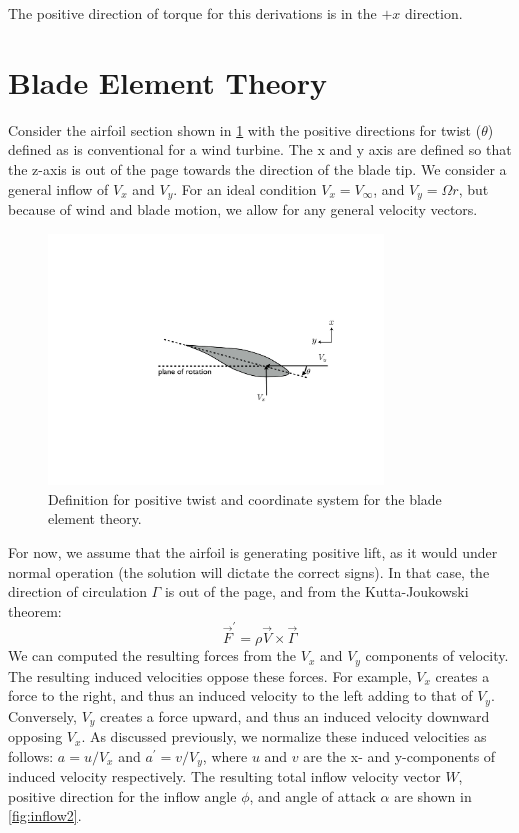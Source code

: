 \documentclass{article}
\begin{document}
The positive direction of torque for this derivations is in the $+x$ direction.

\section{Blade Element Theory}
\label{sec:be}

Consider the airfoil section shown in \cref{fig:inflow1} with the positive directions for twist ($\theta$) defined as is conventional for a wind turbine.  The x and y axis are defined so that the z-axis is out of the page towards the direction of the blade tip.  We consider a general inflow of $V_x$ and $V_y$.  For an ideal condition $V_x = V_\infty$, and $V_y = \Omega r$, but because of wind and blade motion, we allow for any general velocity vectors.

\begin{figure}[htbp]
\centering
\includegraphics[width=3.5in]{figures/inflow1}
\caption{Definition for positive twist and coordinate system for the blade element theory.}
\label{fig:inflow1}
\end{figure}

For now, we assume that the airfoil is generating positive lift, as it would under normal operation (the solution will dictate the correct signs).  In that case, the direction of circulation $\Gamma$ is out of the page, and from the Kutta-Joukowski theorem:
\begin{equation}
    \vec{F}^\prime = \rho \vec{V} \times \vec{\Gamma}
\end{equation}
We can computed the resulting forces from the $V_x$ and $V_y$ components of velocity.  The resulting induced velocities oppose these forces.  For example, $V_x$ creates a force to the right, and thus an induced velocity to the left adding to that of $V_y$.  Conversely, $V_y$ creates a force upward, and thus an induced velocity downward opposing $V_x$.  As discussed previously, we normalize these induced velocities as follows: $a = u/V_x$ and $a^\prime = v/V_y$, where $u$ and $v$ are the x- and y-components of induced velocity respectively.  The resulting total inflow velocity vector $W$, positive direction for the inflow angle $\phi$, and angle of attack $\alpha$ are shown in \cref{fig:inflow2}.
\end{document}
